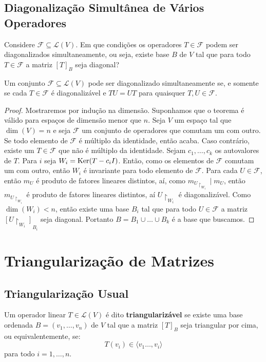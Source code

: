 \documentclass[11pt,twoside,a4paper]{book}
\begin{document}
\subsection{Diagonalização Simultânea de Vários Operadores}

Considere \(\mathcal{F}\subseteq\mathcal{L}(V)\). Em que condições os operadores $T\in\mathcal{F}$ podem ser diagonalizados simultaneamente, ou seja, existe base $B$ de $V$ tal que para todo $T\in\mathcal{F}$ a matriz $[T]_B$ seja diagonal?

\begin{teorema}
Um conjunto \(\mathcal{F}\subseteq\mathcal{L}(V)\) pode ser diagonalizado
simultaneamente se, e somente se cada \(T\in\mathcal{F}\) é diagonalizável e \(TU=UT\) para quaisquer \(T,U\in\mathcal{F}\).
\end{teorema}
\begin{proof}
Mostraremos por indução na dimensão. Suponhamos que o teorema é válido para espaços de dimensão menor que $n$. Seja $V$ um espaço tal que $\dim(V)=n$ e seja $\mathcal{F}$ um conjunto de operadores que comutam um com outro. Se todo elemento de $\mathcal{F}$ é múltiplo da identidade, então acaba. Caso contrário, existe um $T\in\mathcal{F}$ que não é múltiplo da identidade. Sejam $c_1,\dots,c_k$ os autovalores de $T$. Para $i$ seja $W_i=\operatorname{Ker}(T-c_iI)$. Então, como os elementos de $\mathcal{F}$ comutam um com outro, então $W_i$ é invariante para todo elemento de $\mathcal{F}$. Para cada $U\in\mathcal{F}$, então $m_U$ é produto de fatores lineares distintos, aí, como $m_{U\upharpoonright_{W_i}}\mid m_U$, então $m_{U\upharpoonright_{W_i}}$ é produto de fatores lineares distintos, aí $U\upharpoonright_{W_i}$ é diagonalizável. Como $\dim(W_i)<n$, então existe uma base $B_i$ tal que para todo $U\in\mathcal{F}$ a matriz $[U\upharpoonright_{W_i}]_{B_i}$ seja diagonal. Portanto $B=B_1\cup\dots\cup B_k$ é a base que buscamos.
\end{proof}

\section{Triangularização de Matrizes}

\subsection{Triangularização Usual}

\begin{definicao}
Um operador linear $T\in\mathcal{L}(V)$ é dito \textbf{triangularizável} se existe uma
base ordenada $B=(v_1,\dots,v_n)$ de $V$ tal que a matriz $[T]_B$ seja triangular por cima, ou equivalentemente, se:
\[
T(v_i)\in\langle v_1\dots,v_i\rangle
\]
para todo $i=1,\dots,n$.
\end{definicao}
\end{document}
